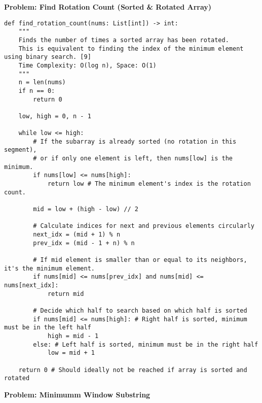 \noindent\textbf{Problem: Find Rotation Count (Sorted & Rotated Array)}
\begin{verbatim}
def find_rotation_count(nums: List[int]) -> int:
    """
    Finds the number of times a sorted array has been rotated.
    This is equivalent to finding the index of the minimum element using binary search. [9]
    Time Complexity: O(log n), Space: O(1)
    """
    n = len(nums)
    if n == 0:
        return 0
    
    low, high = 0, n - 1
    
    while low <= high:
        # If the subarray is already sorted (no rotation in this segment),
        # or if only one element is left, then nums[low] is the minimum.
        if nums[low] <= nums[high]:
            return low # The minimum element's index is the rotation count.

        mid = low + (high - low) // 2
        
        # Calculate indices for next and previous elements circularly
        next_idx = (mid + 1) % n 
        prev_idx = (mid - 1 + n) % n 

        # If mid element is smaller than or equal to its neighbors, it's the minimum element.
        if nums[mid] <= nums[prev_idx] and nums[mid] <= nums[next_idx]:
            return mid
        
        # Decide which half to search based on which half is sorted
        if nums[mid] <= nums[high]: # Right half is sorted, minimum must be in the left half
            high = mid - 1
        else: # Left half is sorted, minimum must be in the right half
            low = mid + 1
            
    return 0 # Should ideally not be reached if array is sorted and rotated
\end{verbatim}
\noindent\textbf{Problem: Minimumm Window Substring }
